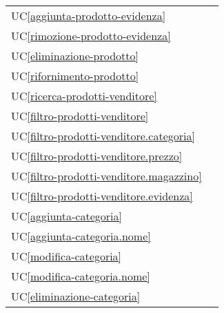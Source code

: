 \begin{longtable}{C{6cm} C{6cm}}
    UC\ref{aggiunta-prodotto-evidenza} &  \\

	UC\ref{rimozione-prodotto-evidenza} &  \\

    UC\ref{eliminazione-prodotto} &  \\

    UC\ref{rifornimento-prodotto} &  \\

    UC\ref{ricerca-prodotti-venditore} &  \\

	UC\ref{filtro-prodotti-venditore} &  \\

    UC\ref{filtro-prodotti-venditore.categoria} &  \\

	UC\ref{filtro-prodotti-venditore.prezzo} &  \\

    UC\ref{filtro-prodotti-venditore.magazzino} &  \\

	UC\ref{filtro-prodotti-venditore.evidenza} &  \\

    UC\ref{aggiunta-categoria} &  \\

	UC\ref{aggiunta-categoria.nome} &  \\

    UC\ref{modifica-categoria} &  \\

	UC\ref{modifica-categoria.nome} &  \\

    UC\ref{eliminazione-categoria} &  \\


\end{longtable}
